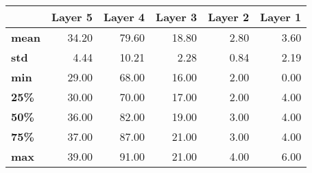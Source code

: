 \begin{tabular}{lrrrrr}
\toprule
{} &  Layer 5 &  Layer 4 &  Layer 3 &  Layer 2 &  Layer 1 \\
\midrule
\textbf{mean} &    34.20 &    79.60 &    18.80 &     2.80 &     3.60 \\
\textbf{std } &     4.44 &    10.21 &     2.28 &     0.84 &     2.19 \\
\textbf{min } &    29.00 &    68.00 &    16.00 &     2.00 &     0.00 \\
\textbf{25\% } &    30.00 &    70.00 &    17.00 &     2.00 &     4.00 \\
\textbf{50\% } &    36.00 &    82.00 &    19.00 &     3.00 &     4.00 \\
\textbf{75\% } &    37.00 &    87.00 &    21.00 &     3.00 &     4.00 \\
\textbf{max } &    39.00 &    91.00 &    21.00 &     4.00 &     6.00 \\
\bottomrule
\end{tabular}
